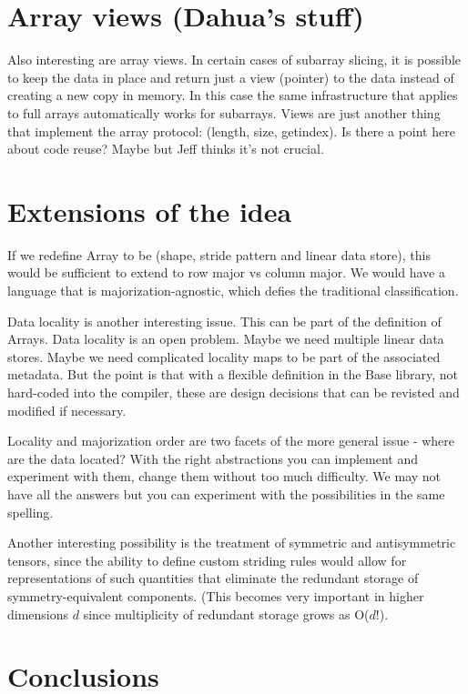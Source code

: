 \documentclass[preprint]{sigplanconf}
\begin{document}
\section{Array views (Dahua's stuff)}

Also interesting are array views. In certain cases of subarray slicing, it is
possible to keep the data in place and return just a view (pointer) to the
data instead of creating a new copy in memory. In this case the same
infrastructure that applies to full arrays automatically works for subarrays.
Views are just another thing that implement the array protocol: (length, size,
getindex). Is there a point here about code reuse? Maybe but Jeff thinks it's
not crucial.

\section{Extensions of the idea}

If we redefine Array to be (shape, stride pattern and linear data store), this
would be sufficient to extend to row major vs column major. We would have a
language that is majorization-agnostic, which defies the traditional
classification.

Data locality is another interesting issue. This can be part of the definition
of Arrays. Data locality is an open problem. Maybe we need multiple linear
data stores. Maybe we need complicated locality maps to be part of the
associated metadata. But the point is that with a flexible definition in the
Base library, not hard-coded into the compiler, these are design decisions
that can be revisted and modified if necessary.

Locality and majorization order are two facets of the more general issue -
where are the data located? With the right abstractions you can implement and
experiment with them, change them without too much difficulty. We may not have
all the answers but you can experiment with the possibilities in the same
spelling.

Another interesting possibility is the treatment of symmetric and
antisymmetric tensors, since the ability to define custom striding rules would
allow for representations of such quantities that eliminate the redundant
storage of symmetry-equivalent components. (This becomes very important in
higher dimensions $d$ since multiplicity of redundant storage grows as
O($d!$).

\section{Conclusions}
\end{document}
